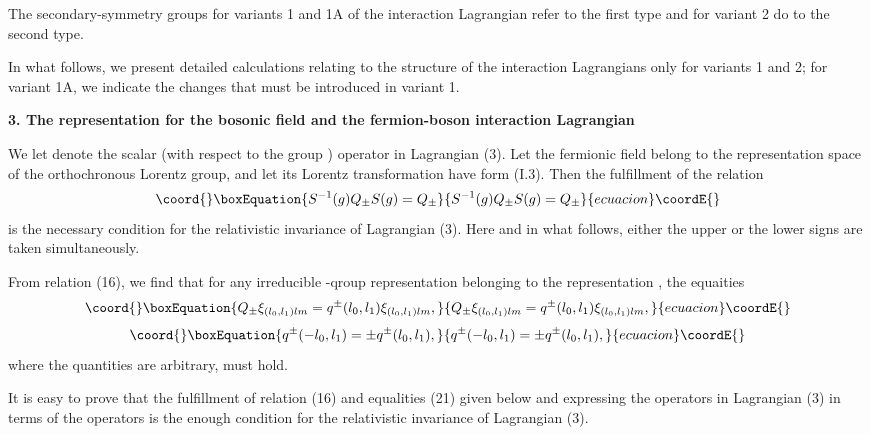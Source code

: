 \documentclass[a4paper,12pt]{article}
\begin{document}
The secondary-symmetry groups for variants 1 and 1A of the interaction
Lagrangian refer to the first type and for variant 2 do to the second type.

In what follows, we present detailed calculations relating to the structure of
the interaction Lagrangians only for variants 1 and 2; for variant 1A, we
indicate the changes that must be introduced in variant 1.

\begin{center}
{\large \bf 3. The representation \coordHE{} for the bosonic field and the
fermion-boson interaction Lagrangian}
\end{center}

We let \coordHE{} denote the scalar (with respect to the group 
\coordHE{}) operator \coordHE{} in Lagrangian (3). Let the
fermionic field \coordHE{} belong to the representation space \coordHE{} of the
orthochronous Lorentz group, and let its Lorentz transformation have form 
(I.3). Then the fulfillment of the relation
\begin{equation}\coord{}\boxEquation{
S^{-1}(g) Q_{\pm} S(g) = Q_{\pm}
}{
S^{-1}(g) Q_{\pm} S(g) = Q_{\pm}
}{ecuacion}\coordE{}\end{equation}
is the necessary condition for the relativistic invariance of Lagrangian (3).
Here and in what follows, either the upper or the lower signs are taken
simultaneously.

From relation (16), we find that for any irreducible \coordHE{}-qroup
representation \coordHE{} belonging to the representation \coordHE{}, the
equaities 
\begin{equation}\coord{}\boxEquation{
Q_{\pm} \xi_{(l_{0},l_{1})lm} = q^{\pm}(l_{0},l_{1}) \xi_{(l_{0},l_{1})lm},
}{
Q_{\pm} \xi_{(l_{0},l_{1})lm} = q^{\pm}(l_{0},l_{1}) \xi_{(l_{0},l_{1})lm},
}{ecuacion}\coordE{}\end{equation}
\begin{equation}\coord{}\boxEquation{
q^{\pm}(-l_{0},l_{1}) = \pm q^{\pm}(l_{0},l_{1}),
}{
q^{\pm}(-l_{0},l_{1}) = \pm q^{\pm}(l_{0},l_{1}),
}{ecuacion}\coordE{}\end{equation}
where the quantities \coordHE{} are arbitrary, must hold.

It is easy to prove that the fulfillment of relation (16) and equalities (21)
given below and expressing the operators \coordHE{} in Lagrangian (3) 
in terms of the operators \coordHE{} is the enough condition for the
relativistic invariance of Lagrangian (3).
\end{document}
